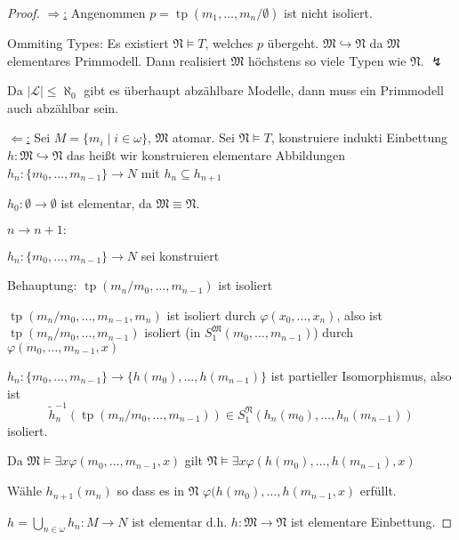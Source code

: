 \documentclass[12pt,parskip=full]{scrartcl}
\newcommand{\abs}[1]{{\left| #1 \right|}}
\newcommand{\heading}{\underline}
\theoremstyle{definition}
\begin{document}
	\begin{proof}
		\heading{$\Rightarrow$:} Angenommen $p = \operatorname{tp}(m_1, \dots, m_n / \emptyset)$ ist nicht isoliert.
		
		Ommiting Types: Es existiert $\mathfrak{N} \models T$, welches $p$ übergeht. $\mathfrak{M} \hookrightarrow \mathfrak{N}$ da $\mathfrak{M}$ elementares Primmodell. Dann realisiert $\mathfrak{M}$ höchstens so viele Typen wie $\mathfrak{N}$. $\lightning$
		
		Da $\abs{\mathcal{L}} \leq \aleph_0$ gibt es überhaupt abzählbare Modelle, dann muss ein Primmodell auch abzählbar sein.
		
		\heading{$\Leftarrow$:} Sei $M = \{ m_i \mid i \in \omega \}$, $\mathfrak{M}$ atomar. Sei $\mathfrak{N} \models T$, konstruiere indukti Einbettung $h: \mathfrak{M} \hookrightarrow \mathfrak{N}$ das heißt wir konstruieren elementare Abbildungen $h_n: \{ m_0, \dots, m_{n-1} \} \to N$ mit $h_n \subseteq h_{n+1}$
		
		$h_0: \emptyset \to \emptyset$ ist elementar, da $\mathfrak{M} \equiv \mathfrak{N}$.
		
		$n \to n+1:$
		
		$h_n: \{ m_0, \dots, m_{n-1} \} \to N$ sei konstruiert
		
		Behauptung: $\operatorname{tp}(m_n / m_0, \dots, m_{n-1})$ ist isoliert
		
		$\operatorname{tp}(m_n / m_0, \dots, m_{n-1}, m_n)$ ist isoliert durch $\varphi(x_0, \dots, x_n)$, also ist $\operatorname{tp}(m_n / m_0, \dots, m_{n-1})$ isoliert (in $S_1^\mathfrak{M}(m_0, \dots, m_{n-1})$) durch $\varphi(m_0, \dots, m_{n-1}, x)$
		
		$h_n: \{ m_0, \dots, m_{n-1} \} \to \{ h(m_0), \dots, h(m_{n-1}) \}$ ist partieller Isomorphismus, also ist
		\begin{equation*}
			\tilde{h}_n^{-1}(\operatorname{tp}(m_n / m_0, \dots, m_{n-1})) \in S_1^\mathfrak{N}(h_n(m_0), \dots, h_n(m_{n-1}))
		\end{equation*}
		isoliert.
		
		Da $\mathfrak{M} \models \exists x \varphi(m_0, \dots, m_{n-1}, x)$ gilt $\mathfrak{N} \models \exists x \varphi(h(m_0), \dots, h(m_{n-1}), x)$
		
		Wähle $h_{n+1}(m_n)$ so dass es in $\mathfrak{N}$ $\varphi(h(m_0), \dots, h(m_{n-1}, x)$ erfüllt.
		
		$h = \bigcup_{n \in \omega} h_n: M \to N$ ist elementar d.h. $h: \mathfrak{M} \to \mathfrak{N}$ ist elementare Einbettung.	
	\end{proof}
\end{document}
